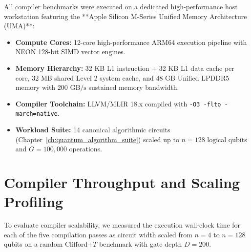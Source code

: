 All compiler benchmarks were executed on a dedicated high-performance host workstation featuring the **Apple Silicon M-Series Unified Memory Architecture (UMA)**:
\begin{itemize}
    \item \textbf{Compute Cores:} 12-core high-performance ARM64 execution pipeline with NEON 128-bit SIMD vector engines.
    \item \textbf{Memory Hierarchy:} 32 KB L1 instruction + 32 KB L1 data cache per core, 32 MB shared Level 2 system cache, and 48 GB Unified LPDDR5 memory with $200\text{ GB/s}$ sustained memory bandwidth.
    \item \textbf{Compiler Toolchain:} LLVM/MLIR 18.x compiled with \texttt{-O3 -flto -march=native}.
    \item \textbf{Workload Suite:} 14 canonical algorithmic circuits (Chapter~\ref{ch:quantum_algorithm_suite}) scaled up to $n = 128$ logical qubits and $G = 100,000$ operations.
\end{itemize}

\section{Compiler Throughput and Scaling Profiling}
\label{sec:compiler_throughput}

To evaluate compiler scalability, we measured the execution wall-clock time for each of the five compilation passes as circuit width scaled from $n = 4$ to $n = 128$ qubits on a random Clifford+$T$ benchmark with gate depth $D = 200$.

